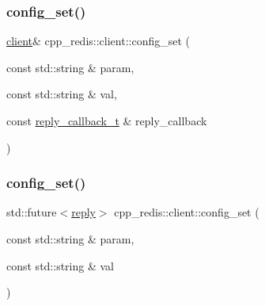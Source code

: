 \mbox{\label{classcpp__redis_1_1client_a0cff7147cd982a39cc84f91243a27364}} 
\subsubsection{\texorpdfstring{config\+\_\+set()}{config\_set()}\hspace{0.1cm}{\footnotesize\ttfamily [1/2]}}
{\footnotesize\ttfamily \hyperlink{classcpp__redis_1_1client}{client}\& cpp\+\_\+redis\+::client\+::config\+\_\+set (\begin{DoxyParamCaption}\item[{const std\+::string \&}]{param,  }\item[{const std\+::string \&}]{val,  }\item[{const \hyperlink{classcpp__redis_1_1client_a061a1140d36d2eaeda82b09a0bb3f9f2}{reply\+\_\+callback\+\_\+t} \&}]{reply\+\_\+callback }\end{DoxyParamCaption})}

\mbox{\label{classcpp__redis_1_1client_a8fdeb462b43ea6f5199145696713f9b1}} 
\subsubsection{\texorpdfstring{config\+\_\+set()}{config\_set()}\hspace{0.1cm}{\footnotesize\ttfamily [2/2]}}
{\footnotesize\ttfamily std\+::future$<$\hyperlink{classcpp__redis_1_1reply}{reply}$>$ cpp\+\_\+redis\+::client\+::config\+\_\+set (\begin{DoxyParamCaption}\item[{const std\+::string \&}]{param,  }\item[{const std\+::string \&}]{val }\end{DoxyParamCaption})}

\mbox{\label{classcpp__redis_1_1client_adda8b3e7b4f9c80ac052753b39178dd5}} 
